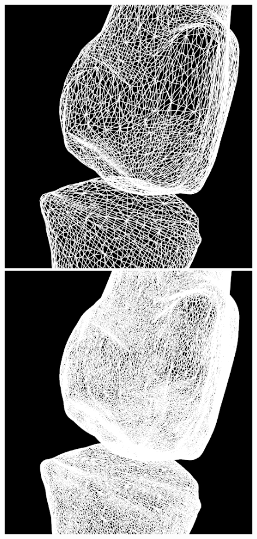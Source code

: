 \documentclass[10pt, conference, compsocconf]{IEEEtran}
\begin{document}
\begin{figure}[htbp]
{\begin{minipage}[h]{0.16\linewidth}
        \includegraphics[width=\textwidth]{./Figure/footbones/fingerBones/catmull2-.png}\\
        \includegraphics[width=\textwidth]{./Figure/footbones/fingerBones/catmull3-.png}\vspace{1ex}\\

\end{minipage}}
\end{figure}
\end{document}
